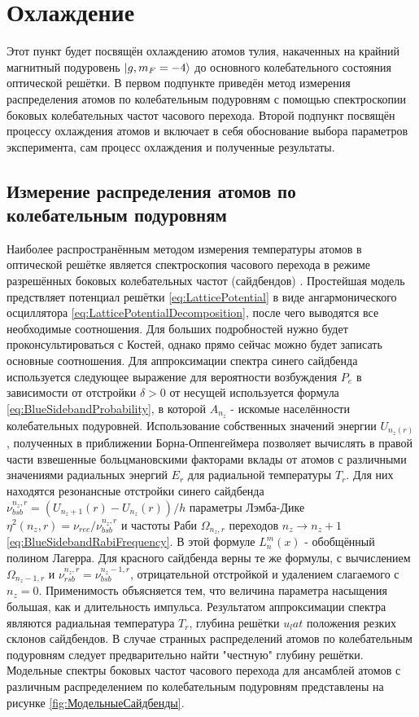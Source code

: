 \section{Охлаждение}

Этот пункт будет посвящён охлаждению атомов тулия, накаченных на крайний магнитный подуровень $\ket{g, m_F = -4}$ до основного колебательного состояния оптической решётки. 
В первом подпункте приведён метод измерения распределения атомов по колебательным подуровням с помощью спектроскопии боковых колебательных частот часового перехода.
Второй подпункт посвящён процессу охлаждения атомов и включает в себя обоснование выбора параметров эксперимента, сам процесс охлаждения и полученные результаты. 

\subsection{Измерение распределения атомов по колебательным подуровням}

Наиболее распространённым методом измерения температуры атомов в оптической решётке является спектроскопия часового перехода в режиме разрешённых боковых колебательных частот (сайдбендов) \cite{}.
Простейшая модель предствляет потенциал решётки \ref{eq:LatticePotential}
в виде ангармонического осциллятора \ref{eq:LatticePotentialDecomposition}, после чего выводятся все необходимые соотношения.
Для больших подробностей нужно будет проконсультироваться с Костей, однако прямо сейчас можно будет записать основные соотношения. 
Для аппроксимации спектра синего сайдбенда используется следующее выражение для вероятности возбуждения $P_e$ в зависимости от отстройки $\delta>0$ от несущей используется формула \ref{eq:BlueSidebandProbability}, в которой $A_{n_z}$ - искомые населённости колебательных подуровней.
Использование собственных значений энергии $U_{n_z (r)}$,  полученных в приближении Борна-Оппенгеймера \cite{beloy2020modeling} позволяет вычислять в правой части взвешенные больцмановскими факторами вклады от атомов с различными значениями радиальных энергий $E_r$ для радиальной температуры $T_r$.
Для них находятся резонансные отстройки синего сайдбенда  $\nu^{n_z, r}_{bsb} = (U_{n_z + 1}(r) - U_{n_z}(r))/h$ параметры Лэмба-Дике $\eta^2 (n_z, r) = \nu_{rec}/\nu^{n_z, r}_{bsb}$ и частоты Раби $\Omega_{n_z, r}$ переходов $n_z \xrightarrow{} n_z + 1$ \ref{eq:BlueSidebandRabiFrequency}.
В этой формуле $L^m_n (x)$ - обобщённый полином Лагерра. 
Для красного сайдбенда верны те же формулы, с вычислением $\Omega_{n_z - 1, r}$ и $\nu^{n_z, r}_{rsb} = \nu^{n_z - 1, r}_{bsb}$, отрицательной отстройкой и удалением слагаемого с $n_z = 0$. 
Применимость объясняется тем, что величина параметра насыщения большая, как и длительность импульса.
Результатом аппроксимации спектра являются радиальная температура $T_r$, глубина решётки $u_lat$ положения резких склонов сайдбендов. 
В случае странных распределений атомов по колебательным подуровням следует предварительно найти "честную" глубину решётки. 
Модельные спектры боковых частот часового перехода для ансамблей атомов с различным распределением по колебательным подуровням представлены на рисунке \ref{fig:МодельныеСайдбенды}. 

